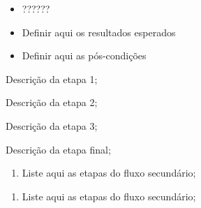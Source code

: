\documentclass{article}
\begin{document}
  \actions
  \begin{itemize}
     \item ??????
    \end{itemize}
  
  \results
  	\begin{itemize}
     \item Definir aqui os resultados esperados
    \end{itemize}

  \postconditions
    \begin{itemize}
     \item Definir aqui as pós-condições
    \end{itemize}
  
  \begin{mainflow}
    \item Descrição da etapa 1;
    \item Descrição da etapa 2;
    \item Descrição da etapa 3;
    \item Descrição da etapa final;
  \end{mainflow}
  
  \begin{secondaryflow} 
    \begin{enumerate}
      \item Liste aqui as etapas do fluxo secundário;
    \end{enumerate}
    \begin{enumerate}
      \item Liste aqui as etapas do fluxo secundário;
    \end{enumerate}
  \end{secondaryflow}  

% 
% 
\end{document}

